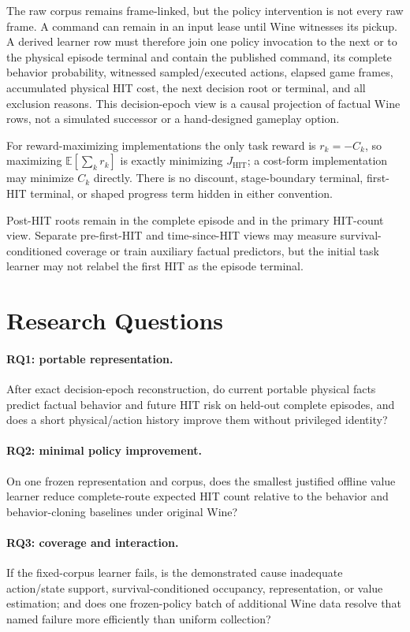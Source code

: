\documentclass[11pt]{article}
\begin{document}
The raw corpus remains frame-linked, but the policy intervention is not every
raw frame.  A command can remain in an input lease until Wine witnesses its
pickup.  A derived learner row must therefore join one policy invocation to the
next or to the physical episode terminal and contain the published command, its
complete behavior probability, witnessed sampled/executed actions, elapsed game
frames, accumulated physical HIT cost, the next decision root or terminal, and
all exclusion reasons.  This
decision-epoch view is a causal projection of factual Wine rows, not a simulated
successor or a hand-designed gameplay option.

For reward-maximizing implementations the only task reward is
$r_k=-C_k$, so maximizing $\mathbb{E}[\sum_k r_k]$ is exactly minimizing
$J_{\mathrm{HIT}}$; a cost-form implementation may minimize $C_k$ directly.
There is no discount, stage-boundary terminal, first-HIT terminal, or shaped
progress term hidden in either convention.

Post-HIT roots remain in the complete episode and in the primary HIT-count
view.  Separate pre-first-HIT and time-since-HIT views may measure
survival-conditioned coverage or train auxiliary factual predictors, but the
initial task learner may not relabel the first HIT as the episode terminal.

\section{Research Questions}

\paragraph{RQ1: portable representation.}
After exact decision-epoch reconstruction, do current portable physical facts
predict factual behavior and future HIT risk on held-out complete episodes, and
does a short physical/action history improve them without privileged identity?

\paragraph{RQ2: minimal policy improvement.}
On one frozen representation and corpus, does the smallest justified offline
value learner reduce complete-route expected HIT count relative to the behavior
and behavior-cloning baselines under original Wine?

\paragraph{RQ3: coverage and interaction.}
If the fixed-corpus learner fails, is the demonstrated cause inadequate
action/state support, survival-conditioned occupancy, representation, or value
estimation; and does one frozen-policy batch of additional Wine data resolve
that named failure more efficiently than uniform collection?
\end{document}
